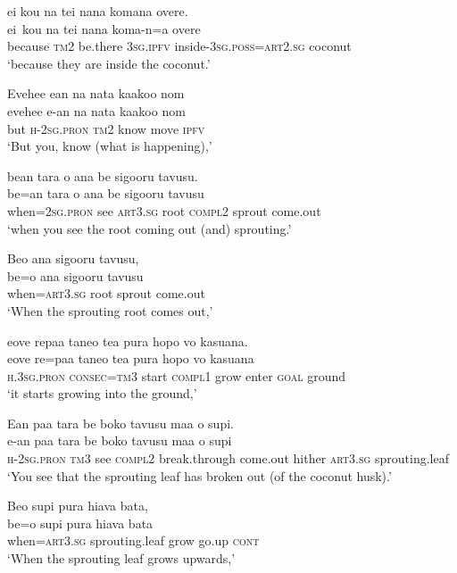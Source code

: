 \ea\label{ex:text01-7}
ei kou na tei nana komana overe.\\
\gll ei~kou	na	tei	nana	koma-n=a	overe\\
     because	\textsc{tm}2	be.there	3\textsc{sg}.\textsc{ipfv}	inside-3\textsc{sg}.\textsc{poss}=\textsc{art}2.\textsc{sg}	coconut\\
\glt `because they are inside the coconut.'
\z

\ea\label{ex:text01-8}
Evehee ean na nata kaakoo nom\\
\gll evehee	e-an	na	nata	kaakoo	nom\\
     but	\textsc{h}-2\textsc{sg}.\textsc{pron}	\textsc{tm}2	know	move	\textsc{ipfv}\\
\glt `But you, know (what is happening),'
\z

\ea\label{ex:text01-9}
bean tara o ana be sigooru tavusu.\\
\gll be=an	tara	o	ana	be	sigooru	tavusu\\
     when=2\textsc{sg}.\textsc{pron}	see	\textsc{art}3.\textsc{sg}	root	\textsc{compl}2	sprout	come.out\\
\glt `when you see the root coming out (and) sprouting.'
\z

\ea\label{ex:text01-10}
Beo ana sigooru tavusu,\\
\gll be=o	ana	sigooru	tavusu\\
     when=\textsc{art}3.\textsc{sg}	root	sprout	come.out\\
\glt `When the sprouting root comes out,'
\z

\ea\label{ex:text01-11}
eove repaa taneo tea pura hopo vo kasuana.\\
\gll eove	re=paa	taneo	tea	pura	hopo	vo	kasuana\\
     \textsc{h}.3\textsc{sg}.\textsc{pron}	\textsc{consec}=\textsc{tm}3	start	\textsc{compl}1	grow	enter	\textsc{goal}	ground\\
\glt `it starts growing into the ground,'
\z

\ea\label{ex:text01-12}
Ean paa tara be boko tavusu maa o supi.\\
\gll e-an	paa	tara	be	boko	tavusu	maa	o	supi\\
     \textsc{h}-2\textsc{sg}.\textsc{pron}	\textsc{tm}3	see	\textsc{compl}2	break.through	come.out	hither	\textsc{art}3.\textsc{sg}	sprouting.leaf\\
\glt `You see that the sprouting leaf has broken out (of the coconut husk).'
\z

\ea\label{ex:text01-13}
Beo supi pura hiava bata,\\
\gll be=o	supi	pura	hiava	bata\\
     when=\textsc{art}3.\textsc{sg}	sprouting.leaf	grow	go.up	\textsc{cont}\\
\glt `When the sprouting leaf grows upwards,'
\z

